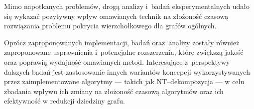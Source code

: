   Mimo napotkanych problemów, drogą analizy i~badań eksperymentalnych udało się wykazać pozytywny wpływ omawianych technik na złożoność czasową rozwiązania problemu pokrycia wierzchołkowego dla grafów ogólnych.

  Oprócz zaproponowanych implementacji, badań oraz~analizy zostały również zaproponowane usprawnienia i~potencjalne rozszerzenia, które zwiększą jakość oraz poprawią wydajność omawianych metod.
  Interesujące z~perspektywy dalszych badań jest zastosowanie innych wariantów koncepcji wykorzystywanych przez zaimplementowane algorytmy --- takich jak NT--dekompozycja --- w celu zbadania wpływu ich zmiany na złożoność czasową algorytmów oraz ich efektywność w redukcji dziedziny grafu.